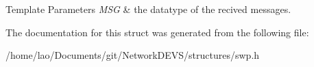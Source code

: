 \begin{DoxyTemplParams}{Template Parameters}
{\em M\+SG} & the datatype of the recived messages. \\
\hline
\end{DoxyTemplParams}


The documentation for this struct was generated from the following file\+:\begin{DoxyCompactItemize}
\item 
/home/lao/\+Documents/git/\+Network\+D\+E\+V\+S/structures/swp.\+h\end{DoxyCompactItemize}
